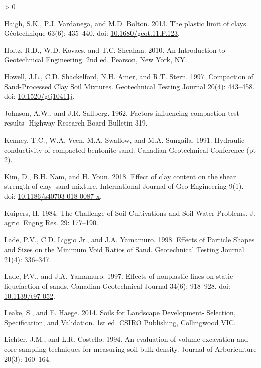 \documentclass[
  letterpaper,
  openany]{book}
\newlength{\cslhangindent}
\newenvironment{CSLReferences}[2] %
 {%
  \setlength{\parindent}{0pt}
  \ifodd #1 \everypar{\setlength{\hangindent}{\cslhangindent}}\ignorespaces\fi
  \ifnum #2 > 0
  \setlength{\parskip}{#2\baselineskip}
  \fi
 }%
 {}
\begin{document}
\begin{CSLReferences}{1}{0}
\leavevmode\hypertarget{ref-Haigh2013}{}%
Haigh, S.K., P.J. Vardanega, and M.D. Bolton. 2013. {The plastic limit of clays}. G{é}otechnique 63(6): 435--440. doi: \href{https://doi.org/10.1680/geot.11.P.123}{10.1680/geot.11.P.123}.

\leavevmode\hypertarget{ref-Holtz2010}{}%
Holtz, R.D., W.D. Kovacs, and T.C. Sheahan. 2010. {An Introduction to Geotechnical Engineering}. 2nd ed. Pearson, New York, NY.

\leavevmode\hypertarget{ref-Howell1997}{}%
Howell, J.L., C.D. Shackelford, N.H. Amer, and R.T. Stern. 1997. {Compaction of Sand-Processed Clay Soil Mixtures}. Geotechnical Testing Journal 20(4): 443--458. doi: \href{https://doi.org/10.1520/gtj10411j}{10.1520/gtj10411j}.

\leavevmode\hypertarget{ref-Johnson1962}{}%
Johnson, A.W., and J.R. Sallberg. 1962. {Factors influencing compaction test results- Highway Research Board Bulletin 319}.

\leavevmode\hypertarget{ref-Kenney1991}{}%
Kenney, T.C., W.A. Veen, M.A. Swallow, and M.A. Sungaila. 1991. {Hydraulic conductivity of compacted bentonite-sand}. Canadian Geotechnical Conference (pt 2).

\leavevmode\hypertarget{ref-Kim2018}{}%
Kim, D., B.H. Nam, and H. Youn. 2018. {Effect of clay content on the shear strength of clay--sand mixture}. International Journal of Geo-Engineering 9(1). doi: \href{https://doi.org/10.1186/s40703-018-0087-x}{10.1186/s40703-018-0087-x}.

\leavevmode\hypertarget{ref-Kuipers1984}{}%
Kuipers, H. 1984. {The Challenge of Soil Cultivations and Soil Water Problems}. J. agric. Engng Res. 29: 177--190.

\leavevmode\hypertarget{ref-Lade1998}{}%
Lade, P.V., C.D. Liggio Jr., and J.A. Yamamuro. 1998. {Effects of Particle Shapes and Sizes on the Minimum Void Ratios of Sand}. Geotechnical Testing Journal 21(4): 336--347.

\leavevmode\hypertarget{ref-Lade1997}{}%
Lade, P.V., and J.A. Yamamuro. 1997. {Effects of nonplastic fines on static liquefaction of sands}. Canadian Geotechnical Journal 34(6): 918--928. doi: \href{https://doi.org/10.1139/t97-052}{10.1139/t97-052}.

\leavevmode\hypertarget{ref-Leake2014}{}%
Leake, S., and E. Haege. 2014. {Soils for Landscape Development- Selection, Specification, and Validation}. 1st ed. CSIRO Publishing, Collingwood VIC.

\leavevmode\hypertarget{ref-Lichter1994}{}%
Lichter, J.M., and L.R. Costello. 1994. {An evaluation of volume excavation and core sampling techniques for measuring soil bulk density}. Journal of Arboriculture 20(3): 160--164.


\end{CSLReferences}
\end{document}
